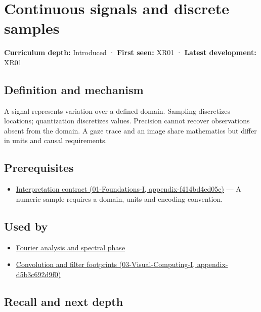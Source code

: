 \hypertarget{appendix-1077ea8fc737}{}
\section{Continuous signals and discrete samples}\label{appendix-1077ea8fc737-continuous-signals-and-discrete-samples}

\textbf{Curriculum depth:} Introduced · \textbf{First seen:} XR01 · \textbf{Latest development:} XR01

\subsection{Definition and mechanism}\label{appendix-1077ea8fc737-definition-and-mechanism}

A signal represents variation over a defined domain. Sampling discretizes locations; quantization discretizes values. Precision cannot recover observations absent from the domain. A gaze trace and an image share mathematics but differ in units and causal requirements.

\subsection{Prerequisites}\label{appendix-1077ea8fc737-prerequisites}

\begin{itemize}
\tightlist
\item
  \href{../01-Foundations-I/main.pdf\#nameddest=appendix-f414bd4ed05c}{Interpretation contract (01-Foundations-I, appendix-f414bd4ed05c)} --- A numeric sample requires a domain, units and encoding convention.
\end{itemize}

\subsection{Used by}\label{appendix-1077ea8fc737-used-by}

\begin{itemize}
\tightlist
\item
  \hyperref[appendix-b60686ba06a1]{Fourier analysis and spectral phase}
\item
  \href{../03-Visual-Computing-I/main.pdf\#nameddest=appendix-d5b3c692d9f0}{Convolution and filter footprints (03-Visual-Computing-I, appendix-d5b3c692d9f0)}
\end{itemize}

\subsection{Recall and next depth}\label{appendix-1077ea8fc737-recall-and-next-depth}

